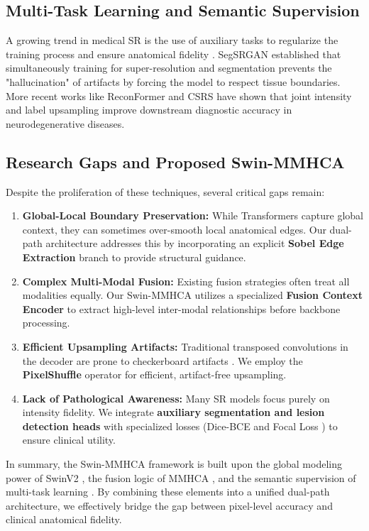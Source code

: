 \subsection{Multi-Task Learning and Semantic Supervision}
A growing trend in medical SR is the use of auxiliary tasks to regularize the training process and ensure anatomical fidelity \cite{dense_med, joint_sr_seg_2023}. SegSRGAN \cite{segsrgan} established that simultaneously training for super-resolution and segmentation prevents the "hallucination" of artifacts by forcing the model to respect tissue boundaries. More recent works like ReconFormer \cite{reconformer} and CSRS \cite{joint_sr_seg_2023} have shown that joint intensity and label upsampling improve downstream diagnostic accuracy in neurodegenerative diseases.

\subsection{Research Gaps and Proposed Swin-MMHCA}
Despite the proliferation of these techniques, several critical gaps remain:
\begin{enumerate}
    \item \textbf{Global-Local Boundary Preservation:} While Transformers capture global context, they can sometimes over-smooth local anatomical edges. Our dual-path architecture addresses this by incorporating an explicit \textbf{Sobel Edge Extraction} branch \cite{fscwrn} to provide structural guidance.
    \item \textbf{Complex Multi-Modal Fusion:} Existing fusion strategies often treat all modalities equally. Our Swin-MMHCA utilizes a specialized \textbf{Fusion Context Encoder} to extract high-level inter-modal relationships before backbone processing.
    \item \textbf{Efficient Upsampling Artifacts:} Traditional transposed convolutions in the decoder are prone to checkerboard artifacts \cite{srcnn}. We employ the \textbf{PixelShuffle} operator \cite{edsr} for efficient, artifact-free upsampling.
    \item \textbf{Lack of Pathological Awareness:} Many SR models focus purely on intensity fidelity. We integrate \textbf{auxiliary segmentation and lesion detection heads} with specialized losses (Dice-BCE and Focal Loss \cite{Sajol2024}) to ensure clinical utility.
\end{enumerate}

In summary, the Swin-MMHCA framework is built upon the global modeling power of SwinV2 \cite{swin_trans}, the fusion logic of MMHCA \cite{Georgescu2023}, and the semantic supervision of multi-task learning \cite{segsrgan}. By combining these elements into a unified dual-path architecture, we effectively bridge the gap between pixel-level accuracy and clinical anatomical fidelity.
